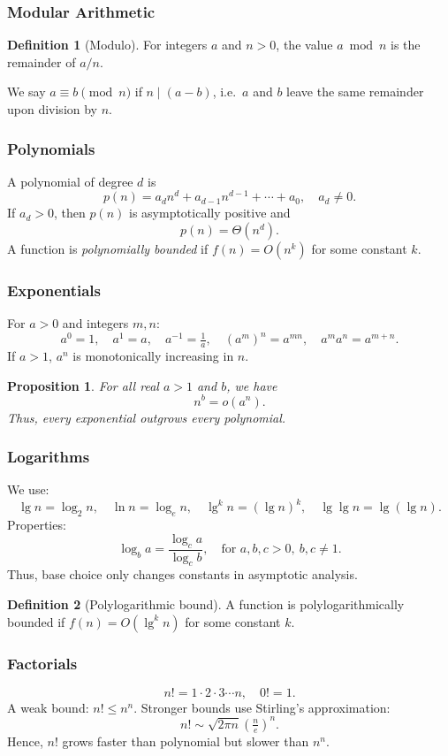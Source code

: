 \documentclass[12pt]{article}
\newtheorem{proposition}[theorem]{Proposition}
\theoremstyle{definition}
\newtheorem{definition}{Definition}
\begin{document}
\subsubsection*{Modular Arithmetic}
\begin{definition}[Modulo]
For integers $a$ and $n > 0$, the value $a \bmod n$ is the remainder of $a / n$.  
\end{definition}
We say $a \equiv b \pmod n$ if $n \mid (a - b)$, i.e.\ $a$ and $b$ leave the same remainder upon division by $n$.  

\subsubsection*{Polynomials}
A polynomial of degree $d$ is
\[
p(n) = a_d n^d + a_{d-1} n^{d-1} + \cdots + a_0, \quad a_d \neq 0.
\]
If $a_d > 0$, then $p(n)$ is asymptotically positive and
\[
p(n) = \Theta(n^d).
\]
A function is \emph{polynomially bounded} if $f(n) = O(n^k)$ for some constant $k$.

\subsubsection*{Exponentials}
For $a > 0$ and integers $m, n$:
\[
a^0 = 1, \quad a^1 = a, \quad a^{-1} = \tfrac{1}{a}, \quad (a^m)^n = a^{mn}, \quad a^m a^n = a^{m+n}.
\]
If $a > 1$, $a^n$ is monotonically increasing in $n$.  
\begin{proposition}
For all real $a > 1$ and $b$, we have
\[
n^b = o(a^n).
\]
Thus, every exponential outgrows every polynomial.
\end{proposition}

\subsubsection*{Logarithms}
We use:
\[
\lg n = \log_2 n, \quad \ln n = \log_e n, \quad \lg^k n = (\lg n)^k, \quad \lg \lg n = \lg(\lg n).
\]
Properties:  
\[
\log_b a = \frac{\log_c a}{\log_c b}, \quad \text{for } a,b,c > 0, \ b,c \neq 1.
\]
Thus, base choice only changes constants in asymptotic analysis.  
\begin{definition}[Polylogarithmic bound]
A function is polylogarithmically bounded if $f(n) = O(\lg^k n)$ for some constant $k$.
\end{definition}

\subsubsection*{Factorials}
\[
n! = 1 \cdot 2 \cdot 3 \cdots n, \quad 0! = 1.
\]
A weak bound: $n! \leq n^n$.  
Stronger bounds use Stirling’s approximation:
\[
n! \sim \sqrt{2 \pi n} \left(\tfrac{n}{e}\right)^n.
\]
Hence, $n!$ grows faster than polynomial but slower than $n^n$.  
\end{document}
